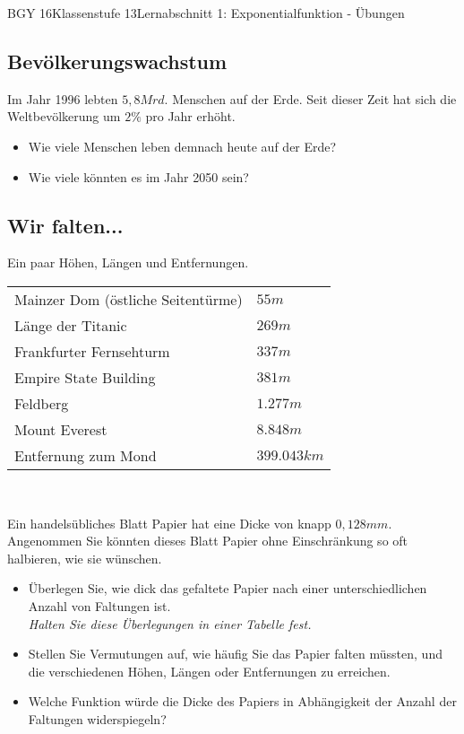 \documentclass[oneside,openany,headings=optiontotoc,11pt,numbers=noenddot]{scrreprt}
\begin{document}
	\begin{worksheet}{BGY 16}{Klassenstufe 13}{Lernabschnitt 1: Exponentialfunktion - Übungen}
				
		\noindent
		\sffamily
		\begin{framed}
			\noindent
			\section*{Bevölkerungswachstum}
			Im Jahr 1996 lebten \(5,8 Mrd.\) Menschen auf der Erde. Seit dieser Zeit hat sich die Weltbevölkerung um \(2\%\) pro Jahr erhöht.
			\begin{itemize}
				\item Wie viele Menschen leben demnach heute auf der Erde?
				\item Wie viele könnten es im Jahr 2050 sein?
			\end{itemize}
		\end{framed}
		\begin{framed}
			\section*{Wir falten...}
			Ein paar Höhen, Längen und Entfernungen.\\
			\par\noindent
			\begin{tabularx}{\textwidth}{lX}
				Mainzer Dom (östliche Seitentürme) & \(55 m\)\\
				Länge der Titanic & \(269 m\)\\
				Frankfurter Fernsehturm & \(337 m\)\\
				Empire State Building & \(381 m\)\\
				Feldberg & \(1.277 m\)\\
				Mount Everest & \(8.848 m\)\\
				Entfernung zum Mond & \(399.043 km\)
			\end{tabularx}\\
			\par\noindent
			Ein handelsübliches Blatt Papier hat eine Dicke von knapp \(0,128 mm\).\\
			Angenommen Sie könnten dieses Blatt Papier ohne Einschränkung so oft halbieren, wie sie wünschen.
			\begin{itemize}
				\item Überlegen Sie, wie dick das gefaltete Papier nach einer unterschiedlichen Anzahl von Faltungen ist.\\
				\textit{Halten Sie diese Überlegungen in einer Tabelle fest.}
				\item Stellen Sie Vermutungen auf, wie häufig Sie das Papier falten müssten, und die verschiedenen Höhen, Längen oder Entfernungen zu erreichen.
				\item Welche Funktion würde die Dicke des Papiers in Abhängigkeit der Anzahl der Faltungen widerspiegeln?
			\end{itemize}
		\end{framed}
		\newpage
		\begin{framed}

\end{framed}
\end{worksheet}
\end{document}
